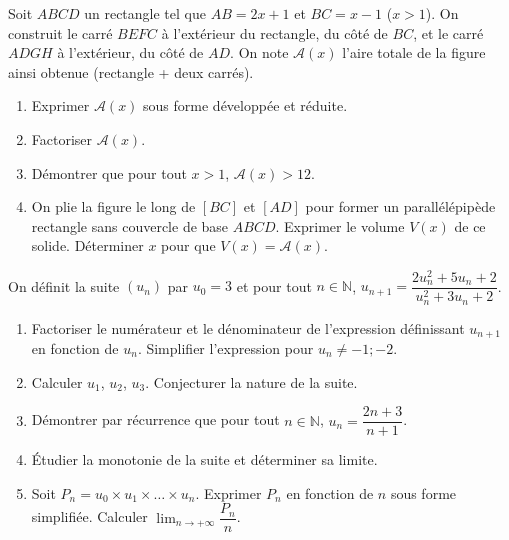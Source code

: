 \documentclass[11pt]{article}
\begin{document}
\begin{exercice}
Soit $ABCD$ un rectangle tel que $AB = 2x+1$ et $BC = x-1$ ($x>1$). On construit le carré $BEFC$ à l'extérieur du rectangle, du côté de $BC$, et le carré $ADGH$ à l'extérieur, du côté de $AD$. On note $\mathcal{A}(x)$ l'aire totale de la figure ainsi obtenue (rectangle + deux carrés).
\begin{enumerate}
    \item Exprimer $\mathcal{A}(x)$ sous forme développée et réduite.
    \item Factoriser $\mathcal{A}(x)$.
    \item Démontrer que pour tout $x>1$, $\mathcal{A}(x) > 12$.
    \item On plie la figure le long de $[BC]$ et $[AD]$ pour former un parallélépipède rectangle sans couvercle de base $ABCD$. Exprimer le volume $V(x)$ de ce solide. Déterminer $x$ pour que $V(x) = \mathcal{A}(x)$.
\end{enumerate}
\end{exercice}

\begin{exercice}
On définit la suite $(u_n)$ par $u_0 = 3$ et pour tout $n \in \mathbb{N}$, $u_{n+1} = \dfrac{2u_n^2 + 5u_n + 2}{u_n^2 + 3u_n + 2}$.
\begin{enumerate}
    \item Factoriser le numérateur et le dénominateur de l'expression définissant $u_{n+1}$ en fonction de $u_n$. Simplifier l'expression pour $u_n \neq -1; -2$.
    \item Calculer $u_1$, $u_2$, $u_3$. Conjecturer la nature de la suite.
    \item Démontrer par récurrence que pour tout $n \in \mathbb{N}$, $u_n = \dfrac{2n+3}{n+1}$.
    \item Étudier la monotonie de la suite et déterminer sa limite.
    \item Soit $P_n = u_0 \times u_1 \times \dots \times u_n$. Exprimer $P_n$ en fonction de $n$ sous forme simplifiée. Calculer $\lim_{n\to+\infty} \dfrac{P_n}{n}$.
\end{enumerate}
\end{exercice}
\end{document}
